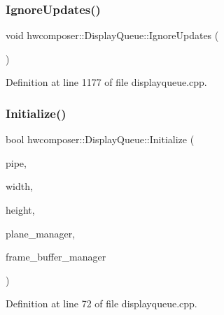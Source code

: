 \subsubsection{\texorpdfstring{Ignore\+Updates()}{IgnoreUpdates()}}
{\footnotesize\ttfamily void hwcomposer\+::\+Display\+Queue\+::\+Ignore\+Updates (\begin{DoxyParamCaption}{ }\end{DoxyParamCaption})}



Definition at line 1177 of file displayqueue.\+cpp.


\begin{DoxyCode}{0}
\end{DoxyCode}
\mbox{\label{classhwcomposer_1_1DisplayQueue_a88b95def4d501f85e2a83bef8b1c832d}} 
\subsubsection{\texorpdfstring{Initialize()}{Initialize()}}
{\footnotesize\ttfamily bool hwcomposer\+::\+Display\+Queue\+::\+Initialize (\begin{DoxyParamCaption}\item[{uint32\+\_\+t}]{pipe,  }\item[{uint32\+\_\+t}]{width,  }\item[{uint32\+\_\+t}]{height,  }\item[{\mbox{\hyperlink{classhwcomposer_1_1DisplayPlaneHandler}{Display\+Plane\+Handler}} $\ast$}]{plane\+\_\+manager,  }\item[{\mbox{\hyperlink{classhwcomposer_1_1FrameBufferManager}{Frame\+Buffer\+Manager}} $\ast$}]{frame\+\_\+buffer\+\_\+manager }\end{DoxyParamCaption})}



Definition at line 72 of file displayqueue.\+cpp.


